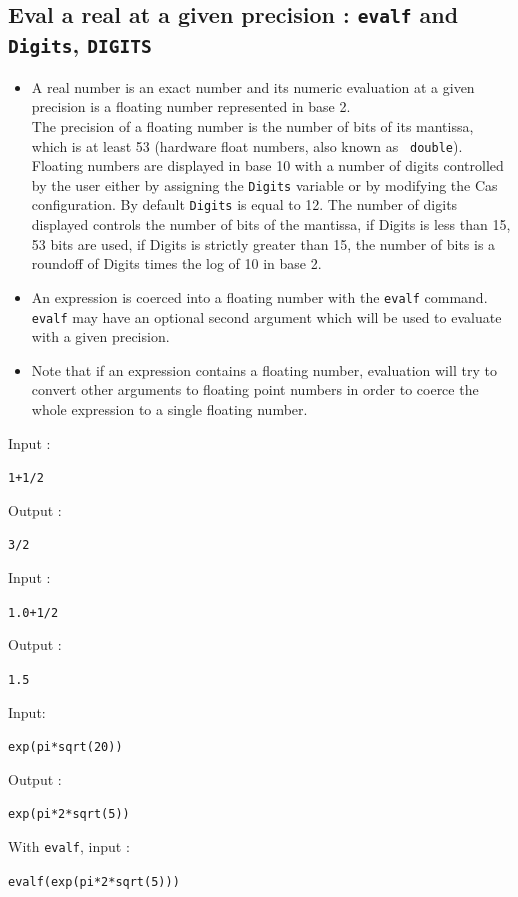 \documentclass[a4paper,11pt]{book}
\begin{document}
\subsection{Eval a real at a given precision : {\tt evalf} and {\tt
    Digits}, {\tt DIGITS}}
\begin{itemize}
\item A real number is an exact number and its numeric evaluation at a given
precision is a floating number represented in base 2.\\
The precision of a floating number is the number of bits of its
mantissa, which is at least 53 (hardware float numbers, also known as {\tt
 double}). Floating numbers are displayed in base 10 with a number
of digits controlled by the user either by assigning the {\tt Digits}
variable or by modifying the Cas configuration. 
By default {\tt Digits} is equal to 12.
The number of digits displayed controls the number of bits of the
mantissa, if Digits is less than 15, 53 bits are used, if Digits is
strictly greater than 15, the number of bits is a roundoff of
Digits times the log of 10 in base 2.
\item
An expression is coerced into a floating number with the {\tt evalf} 
command. {\tt evalf} may have an optional second argument which will
be used to evaluate with a given precision.
\item
Note that if an expression contains a floating number, evaluation will try
to convert other arguments to floating point numbers in order
to coerce the whole expression to a single floating number.
\end{itemize}
Input :
\begin{center}{\tt 1+1/2}\end{center}
Output :
\begin{center}{\tt 3/2}\end{center}
Input :
\begin{center}{\tt 1.0+1/2}\end{center}
Output  :
\begin{center}{\tt 1.5}\end{center}
Input:
\begin{center}{\tt exp(pi*sqrt(20))}\end{center}
Output :
\begin{center}{\tt exp(pi*2*sqrt(5)) }\end{center}
With {\tt evalf}, input :
\begin{center}{\tt evalf(exp(pi*2*sqrt(5)))}\end{center}
\end{document}
